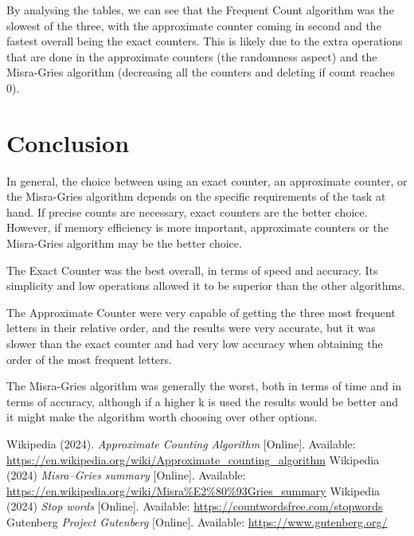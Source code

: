 \documentclass[]{revdetua}
\begin{document}
By analysing the tables, we can see that the Frequent Count algorithm was the slowest of the three, with the approximate counter coming in second and the fastest overall being the exact counters. This is likely due to the extra operations that are done in the approximate counters (the randomness aspect) and the Misra-Gries algorithm (decreasing all the counters and deleting if count reaches 0).

\section{Conclusion}

In general, the choice between using an exact counter, an approximate counter, or the Misra-Gries algorithm depends on the specific requirements of the task at hand. If precise counts are necessary, exact counters are the better choice. However, if memory efficiency is more important, approximate counters or the Misra-Gries algorithm may be the better choice.

The Exact Counter was the best overall, in terms of speed and accuracy. Its simplicity and low operations allowed it to be superior than the other algorithms.

The Approximate Counter were very capable of getting the three most frequent letters in their relative order, and the results were very accurate, but it was slower than the exact counter and had very low accuracy when obtaining the order of the most frequent letters.

The Misra-Gries algorithm was generally the worst, both in terms of time and in terms of accuracy, although if a higher k is used the results would be better and it might make the algorithm worth choosing over other options.

\begin{thebibliography}{00}

 Wikipedia (2024). \textit{Approximate Counting Algorithm} [Online]. Available: \url{https://en.wikipedia.org/wiki/Approximate_counting_algorithm}
 Wikipedia (2024) \textit{Misra–Gries summary} [Online]. Available: \url{https://en.wikipedia.org/wiki/Misra%E2%80%93Gries_summary}
 Wikipedia (2024) \textit{Stop words} [Online]. Available: \url{https://countwordsfree.com/stopwords}
 Gutenberg \textit{Project Gutenberg} [Online]. Available: 
\url{https://www.gutenberg.org/}

\end{thebibliography}
\end{document}
